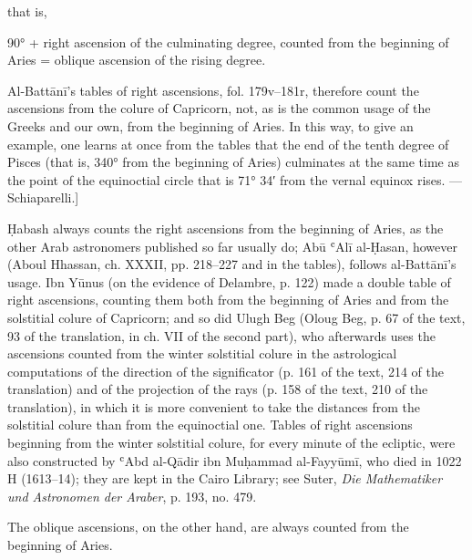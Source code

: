 \documentclass[11pt]{article}
\begin{document}
\par that is,\par
\par\begin{center}90° + right ascension of the culminating degree, counted from the beginning of Aries = oblique ascension of the rising degree.\end{center}
\par Al-Battānī's tables of right ascensions, fol. 179v–181r, therefore count the ascensions from the colure of Capricorn, not, as is the common usage of the Greeks and our own, from the beginning of Aries. In this way, to give an example, one learns at once from the tables that the end of the tenth degree of Pisces (that is, 340° from the beginning of Aries) culminates at the same time as the point of the equinoctial circle that is 71° 34′ from the vernal equinox rises. — Schiaparelli.]\par
\par Ḥabash always counts the right ascensions from the beginning of Aries, as the other Arab astronomers published so far usually do; Abū ʿAlī al-Ḥasan, however (Aboul Hhassan, ch. XXXII, pp. 218–227 and in the tables), follows al-Battānī's usage. Ibn Yūnus (on the evidence of Delambre, p. 122) made a double table of right ascensions, counting them both from the beginning of Aries and from the solstitial colure of Capricorn; and so did Ulugh Beg (Oloug Beg, p. 67 of the text, 93 of the translation, in ch. VII of the second part), who afterwards uses the ascensions counted from the winter solstitial colure in the astrological computations of the direction of the significator (p. 161 of the text, 214 of the translation) and of the projection of the rays (p. 158 of the text, 210 of the translation), in which it is more convenient to take the distances from the solstitial colure than from the equinoctial one. Tables of right ascensions beginning from the winter solstitial colure, for every minute of the ecliptic, were also constructed by ʿAbd al-Qādir ibn Muḥammad al-Fayyūmī, who died in 1022 H (1613–14); they are kept in the Cairo Library; see Suter, \emph{Die Mathematiker und Astronomen der Araber}, p. 193, no. 479.\par
\par The oblique ascensions, on the other hand, are always counted from the beginning of Aries.\par
\end{document}
